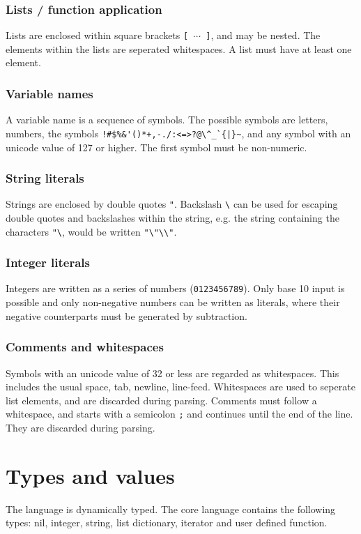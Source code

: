 \subsubsection{Lists / function application}
Lists are enclosed within square brackets \verb|[ |$\cdots$\verb| ]|, and may be nested. The elements within the lists are seperated whitespaces. A list must have at least one element.

\subsubsection{Variable names}
A variable name is a sequence of symbols. The possible symbols are letters, numbers, the symbols \verb]!#$%&'()*+,-./:<=>?@\^_`{|}~], and any symbol with an unicode value of 127 or higher. The first symbol must be non-numeric.

\subsubsection{String literals}
Strings are enclosed by double quotes \verb|"|. Backslash \verb|\| can be used for escaping double quotes and backslashes within the string, e.g. the string containing the characters \verb|"\|, would be written \verb|"\"\\"|.

\subsubsection{Integer literals}
Integers are written as a series of numbers (\verb|0123456789|). Only base 10 input is possible and only non-negative numbers can be written as literals, where their negative counterparts must be generated by subtraction.

\subsubsection{Comments and whitespaces}
Symbols with an unicode value of 32 or less are regarded as whitespaces. This includes the usual space, tab, newline, line-feed. Whitespaces are used to seperate list elements, and are discarded during parsing.
Comments must follow a whitespace, and starts with a semicolon \verb|;| and continues until the end of the line. They are discarded during parsing. 


\section{Types and values}
The language is dynamically typed.
The core language contains the following types: nil, integer, string, list dictionary, iterator and user defined function.

